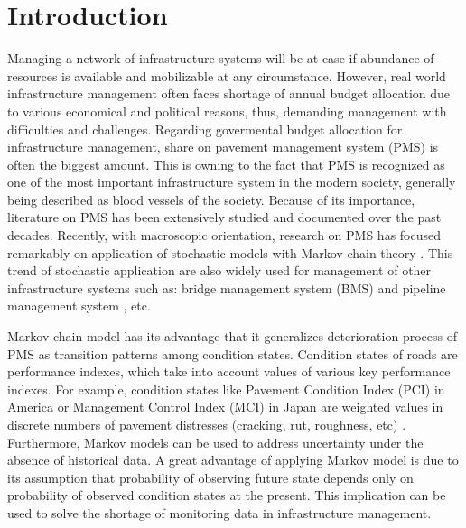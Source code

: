 \documentclass[a4paper,oneside,onecolumn,preprint,10pt,authoryear]{elsarticle}
\begin{document}
\section{Introduction}
\label{sec1}
%
Managing a network of infrastructure systems will be at ease if abundance of resources is available and mobilizable at any circumstance. However, real world infrastructure management often faces shortage of annual budget allocation due to various economical and political reasons, thus, demanding management with difficulties and challenges. Regarding govermental budget allocation for infrastructure management, share on  pavement management system (PMS) is often the biggest amount. This is owning to the fact that PMS is recognized as one of the most important infrastructure system in the modern society, generally being described as blood vessels of the society. Because of its importance, literature on PMS has been extensively studied and documented over the past decades. Recently, with macroscopic orientation, research on PMS has focused remarkably on application of stochastic models with Markov chain theory \citep{Nakat2008,Shin2003,kobayashitsuda}. This trend of stochastic application are also widely used for management of other infrastructure systems such as: bridge management system (BMS) \citep{kobayashitsuda,pontis} and pipeline management system \citep{Sinha2007,Sinha2004}, etc.

Markov chain model has its advantage that it generalizes deterioration process of PMS as  transition patterns among condition states. Condition states of roads are performance indexes, which take into account values of various key performance indexes. For example, condition states like Pavement Condition Index (PCI) in America or Management Control Index (MCI) in Japan are weighted values in discrete numbers of pavement distresses (cracking, rut, roughness, etc) \citep{shahin05,Nam2009}. Furthermore, Markov models can be used to address uncertainty under the absence of historical data. A great advantage of applying Markov model is due to its assumption that probability of observing future state depends only on probability of observed condition states at the present. This implication can be used to solve the shortage of monitoring data in infrastructure management. %
\end{document}
